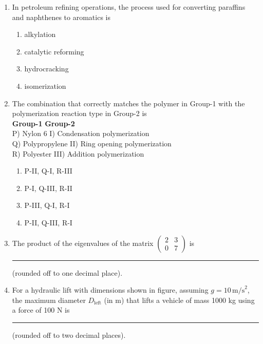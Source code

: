 \documentclass[12pt]{article}
\begin{document}
\begin{enumerate}[label=Q.\arabic*]
	\item In petroleum refining operations, the process used for converting paraffins and naphthenes to aromatics is
		\begin{multicols}{2}
			\begin{enumerate}[label=(\Alph*)]
				\item alkylation
				\item catalytic reforming
				\item hydrocracking
				\item isomerization
			\end{enumerate}
		\end{multicols}

	\item The combination that correctly matches the polymer in Group-1 with the polymerization reaction type in Group-2 is \\

		\textbf{Group-1} \hspace{3cm} \textbf{Group-2} \\
		P) Nylon 6 \hspace{3.2cm} I) Condensation polymerization \\
		Q) Polypropylene \hspace{1.95cm} II) Ring opening polymerization \\
		R) Polyester \hspace{2.8cm} III) Addition polymerization

		\begin{multicols}{2}
			\begin{enumerate}[label=(\Alph*)]
				\item P-II, Q-I, R-III
				\item P-I, Q-III, R-II
				\item P-III, Q-I, R-I
				\item P-II, Q-III, R-I
			\end{enumerate}
		\end{multicols}

	\item The product of the eigenvalues of the matrix $\begin{pmatrix} 2 & 3 \\ 0 & 7 \end{pmatrix}$ is \rule{3cm}{0.15mm} (rounded off to one decimal place).

		\item For a hydraulic lift with dimensions shown in figure, assuming $g = 10\,\text{m/s}^2$, the maximum diameter $D_{\text{left}}$ (in m) that lifts a vehicle of mass 1000 kg using a force of 100 N is \rule{3cm}{0.15mm} (rounded off to two decimal places).


\end{enumerate}
\end{document}
